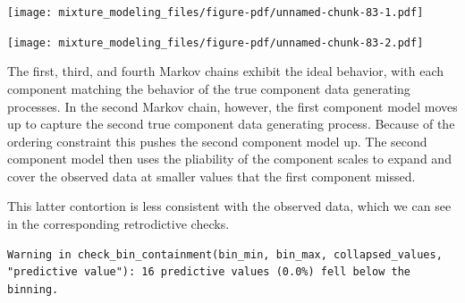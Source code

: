 \documentclass[
  letterpaper,
  DIV=11,
  numbers=noendperiod]{scrartcl}
\newenvironment{Shaded}{\begin{snugshade}}{\end{snugshade}}
\newcommand{\AttributeTok}[1]{\textcolor[rgb]{0.40,0.45,0.13}{#1}}
\newcommand{\ControlFlowTok}[1]{\textcolor[rgb]{0.00,0.23,0.31}{#1}}
\newcommand{\DecValTok}[1]{\textcolor[rgb]{0.68,0.00,0.00}{#1}}
\newcommand{\FloatTok}[1]{\textcolor[rgb]{0.68,0.00,0.00}{#1}}
\newcommand{\FunctionTok}[1]{\textcolor[rgb]{0.28,0.35,0.67}{#1}}
\newcommand{\NormalTok}[1]{\textcolor[rgb]{0.00,0.23,0.31}{#1}}
\newcommand{\OtherTok}[1]{\textcolor[rgb]{0.00,0.23,0.31}{#1}}
\newcommand{\SpecialCharTok}[1]{\textcolor[rgb]{0.37,0.37,0.37}{#1}}
\newcommand{\StringTok}[1]{\textcolor[rgb]{0.13,0.47,0.30}{#1}}
\begin{document}
\texttt{[image: mixture\_modeling\_files/figure-pdf/unnamed-chunk-83-1.pdf]}

\texttt{[image: mixture\_modeling\_files/figure-pdf/unnamed-chunk-83-2.pdf]}

The first, third, and fourth Markov chains exhibit the ideal behavior,
with each component matching the behavior of the true component data
generating processes. In the second Markov chain, however, the first
component model moves up to capture the second true component data
generating process. Because of the ordering constraint this pushes the
second component model up. The second component model then uses the
pliability of the component scales to expand and cover the observed data
at smaller values that the first component missed.

This latter contortion is less consistent with the observed data, which
we can see in the corresponding retrodictive checks.

\begin{Shaded}
\end{Shaded}

\begin{verbatim}
Warning in check_bin_containment(bin_min, bin_max, collapsed_values,
"predictive value"): 16 predictive values (0.0%) fell below the binning.
\end{verbatim}
\end{document}

